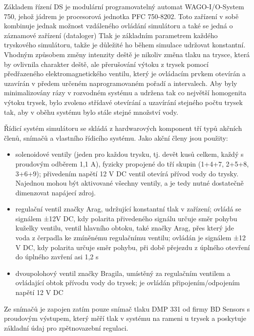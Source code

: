 \label{sss:CZDS_rizeni}
Základem řízení DS je modulární programovatelný automat WAGO-I/O-System 750, jehož jádrem je procesorová jednotka PFC 750-8202. Toto zařízení v sobě kombinuje jednak možnost vzdáleného ovládání simulátoru a také se jedná o záznamové zařízení (dataloger)
Tlak je základním parametrem každého tryskového simulátoru, takže je důležité ho během simulace udržovat konstantní. Vhodným způsobem změny intenzity deště je nikoliv změna tlaku na trysce, která by ovlivnila charakter deště, ale přerušování výtoku z trysek pomocí předřazeného elektromagnetického ventilu, který je ovládacím prvkem otevírán a uzavírán v předem určeném naprogramovaném pořadí a intervalech. Aby byly minimalizovány rázy v rozvodném systému a udržena tak co největší homogenita výtoku trysek, bylo zvoleno střídavé otevírání a uzavírání stejného počtu trysek tak, aby v oběhu systému bylo stále stejné množství vody.

Řídicí systém simulátoru se skládá z hardwarových komponent tří typů akčních členů, snímačů a vlastního řídicího systému. Jako akční členy jsou použity:
\begin{itemize}
\item{solenoidové ventily (jeden pro každou trysku, tj. devět kusů celkem, každý s proudovým odběrem 1,1 A), fyzicky propojené do tří skupin (1+4+7, 2+5+8, 3+6+9); přivedením napětí 12 V DC ventil otevírá přívod vody do trysky. Najednou mohou být aktivované všechny ventily, a je tedy nutné dostatečně dimenzovat napájecí zdroj.}
\item{regulační ventil značky Arag, udržující konstantní tlak v zařízení; ovládá se signálem ±12V DC, kdy polarita přivedeného signálu určuje směr pohybu kuželky ventilu,
ventil hlavního obtoku, také značky Arag, přes který jde voda z čerpadla ke zmíněnému regulačnímu ventilu; ovládán je signálem ±12 V DC, kdy polarita určuje směr pohybu, při době přejezdu z úplného otevření do úplného zavření asi 1,2 s}
\item{dvoupolohový ventil značky Bragila, umístěný za regulačním ventilem a ovládající obtok přívodu vody do trysek; je ovládán připojením/odpojením napětí 12 V DC}
\end{itemize}
 
Ze snímačů je zapojen zatím pouze snímač tlaku DMP 331 od firmy BD Sensors s proudovým výstupem, který měří tlak v systému na rameni u trysek a poskytuje základní údaj pro zpětnovazební regulaci.
 
